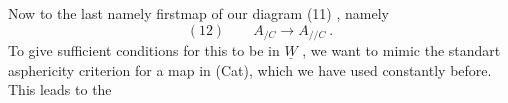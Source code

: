 Now to the last \hand{(}namely first\hand{)}map of our diagram (11) ,  namely
\[ (12) \qquad A_{/C} \to A_{//C} \ . \]
To give sufficient conditions for this to be in $\underline{W}$ ,  we want to mimic
the standart asphericity criterion for a map in (Cat),  which we have
used constantly before.  This leads to the 

